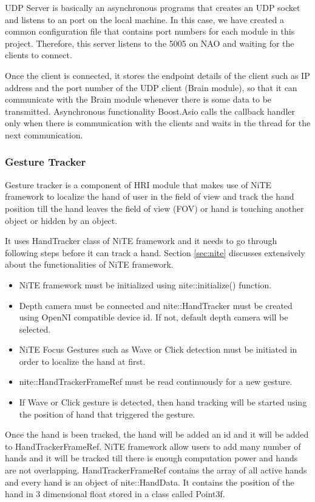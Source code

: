 UDP Server is basically an asynchronous programs that creates an UDP socket and listens to an port on the local machine. In this case, we have created a common configuration file that contains port numbers for each module in this project. Therefore, this server listens to the 5005 on NAO and waiting for the clients to connect. 

Once the client is connected, it stores the endpoint details of the client such as IP address and the port number of the UDP client (Brain module), so that it can communicate with the Brain module whenever there is some data to be transmitted. Asynchronous functionality Boost.Asio calls the callback handler only when there is communication with the clients and waits in the thread for the next communication.

\subsubsection{Gesture Tracker} \label{sec:hri:ges}
Gesture tracker is a component of HRI module that makes use of NiTE framework to localize the hand of user in the field of view and track the hand position till the hand leaves the field of view (FOV) or hand is touching another object or hidden by an object. 

It uses HandTracker class of NiTE framework and it needs to go through following steps before it can track a hand. Section \ref{sec:nite} discusses extensively about the functionalities of NiTE framework.

\begin{itemize}
	\item NiTE framework must be initialized using nite::initialize() function.
	\item Depth camera must be connected and nite::HandTracker must be created using OpenNI compatible  device id. If not, default depth camera will be selected.
	\item NiTE Focus Gestures such as Wave or Click detection must be initiated in order to localize the hand at first.
	\item nite::HandTrackerFrameRef must be read continuously for a new gesture.
	\item If Wave or Click gesture is detected, then hand tracking will be started using the position of hand that triggered the gesture.
\end{itemize}

Once the hand is been tracked, the hand will be added an id and it will be added to HandTrackerFrameRef. NiTE framework allow users to add many number of hands and it will be tracked till there is enough computation power and hands are not overlapping. HandTrackerFrameRef contains the array of all active hands and every hand is an object of nite::HandData. It contains the position of the hand in 3 dimensional float stored in a class called Point3f.

